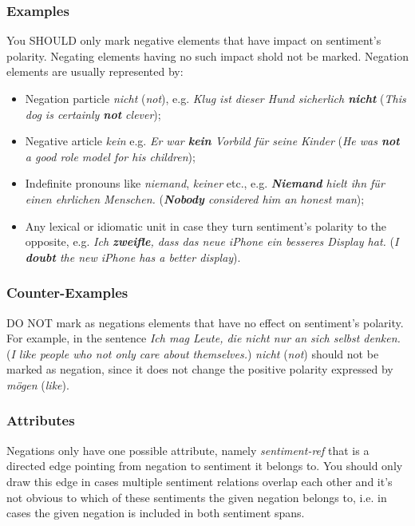 \documentclass[11pt,a4paper]{article}
\begin{document}
\subsubsection{Examples}
You SHOULD only mark negative elements that have impact on
sentiment's polarity. Negating elements having no such impact
shold not be marked. Negation elements are usually represented by:
\begin{itemize}
  \item Negation particle \textit{nicht} (\textit{not}),
    e.g. \textit{Klug ist dieser Hund sicherlich \textbf{nicht}}
    (\textit{This dog is certainly \textbf{not} clever});

  \item Negative article \textit{kein} e.g. \textit{Er war
    \textbf{kein} Vorbild f\"ur seine Kinder} (\textit{He was
    \textbf{not} a good role model for his children});

  \item Indefinite pronouns like \textit{niemand}, \textit{keiner}
    etc., e.g. \textit{\textbf{Niemand} hielt ihn f\"ur einen
      ehrlichen Menschen.} (\textit{\textbf{Nobody} considered him an
      honest man});

  \item Any lexical or idiomatic unit in case they turn sentiment's
    polarity to the opposite, e.g. \textit{Ich \textbf{zweifle}, dass
      das neue iPhone ein besseres Display hat.} (\textit{I
      \textbf{doubt} the new iPhone has a better display}).
\end{itemize}

\subsubsection{Counter-Examples}
DO NOT mark as negations elements that have no effect on sentiment's
polarity. For example, in the sentence \textit{Ich mag Leute, die nicht
  nur an sich selbst denken.} (\textit{I like people who not only care
  about themselves.}) \textit{nicht} (\textit{not}) should not be
marked as negation, since it does not change the positive polarity
expressed by \textit{m\"ogen} (\textit{like}).

\subsubsection{Attributes}
Negations only have one possible attribute, namely
\textit{sentiment-ref} that is a directed edge pointing from negation
to sentiment it belongs to. You should only draw this edge in cases multiple sentiment relations overlap each other and it's not
obvious to which of these sentiments the given negation belongs to,
i.e. in cases the given negation is included in both sentiment spans.
\end{document}
